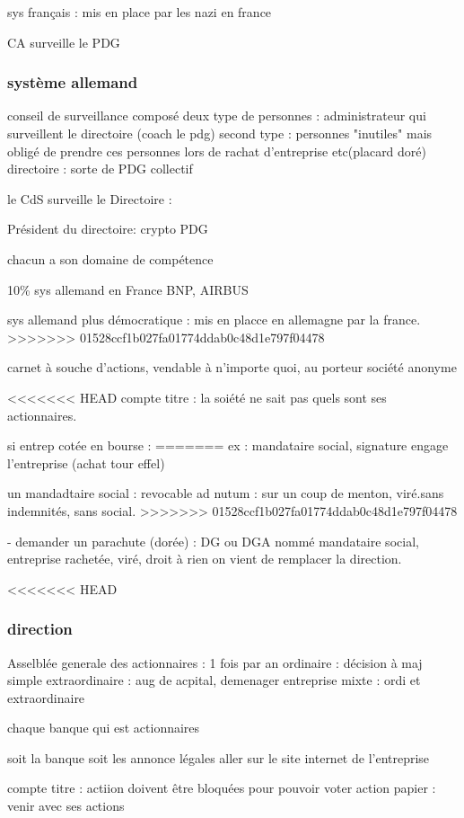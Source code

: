 \documentclass[a4paper,12pt]{article}
\begin{document}
sys français : mis en place par les nazi en france

CA surveille le PDG
\subsubsection{système allemand}

conseil de surveillance composé deux type de personnes : administrateur qui surveillent le directoire (coach le pdg)
second type : personnes "inutiles" mais obligé de prendre ces personnes lors de rachat d'entreprise etc(placard doré)
directoire : sorte de PDG collectif

le CdS surveille le Directoire : 

Président du directoire: crypto PDG

chacun a son domaine de compétence

10\% sys allemand en France
BNP, AIRBUS

sys allemand plus démocratique : mis en placce en allemagne par la france.
>>>>>>> 01528ccf1b027fa01774ddab0c48d1e797f04478

carnet à souche d'actions, vendable à n'importe quoi, au porteur
société anonyme

<<<<<<< HEAD
compte titre : la soiété ne sait pas quels sont ses actionnaires.

si entrep cotée en bourse : 
=======
ex : mandataire social, signature engage l'entreprise (achat tour effel)

un mandadtaire social : revocable ad nutum : sur un coup de menton, viré.sans indemnités, sans social.
>>>>>>> 01528ccf1b027fa01774ddab0c48d1e797f04478

- demander un parachute (dorée) :  DG ou DGA nommé mandataire social, entreprise rachetée, viré, droit à rien
on vient de remplacer la direction.

<<<<<<< HEAD
\subsubsection{direction}

Asselblée generale des actionnaires : 1 fois par an
ordinaire : décision à maj simple
extraordinaire : aug de acpital, demenager entreprise
mixte : ordi et extraordinaire

chaque banque qui est actionnaires

soit la banque
soit les annonce légales
aller sur le site internet de l'entreprise

compte titre : actiion doivent être bloquées pour pouvoir voter
action papier : venir avec ses actions
\end{document}
